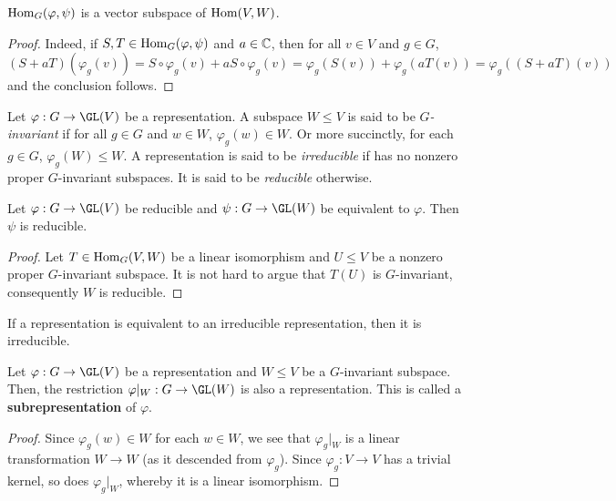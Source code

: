 \begin{proposition}
    $\operatorname{Hom}_G(\varphi,\psi)$ is a vector subspace of $\operatorname{Hom}(V,W)$.
\end{proposition}
\begin{proof}
    Indeed, if $S,T\in\operatorname{Hom}_G(\varphi,\psi)$ and $a\in\mathbb{C}$, then for all $v\in V$ and $g\in G$, 
    \begin{equation*}
        (S + aT)(\varphi_g(v)) = S\circ\varphi_g(v) + aS\circ\varphi_g(v) = \varphi_g(S(v)) + \varphi_g(aT(v)) = \varphi_g((S + aT)(v))
    \end{equation*}
    and the conclusion follows.
\end{proof}

\begin{definition}
    Let $\varphi: G\to\GL(V)$ be a representation. A subspace $W\le V$ is said to be \textit{$G$-invariant} if for all $g\in G$ and $w\in W$, $\varphi_g(w)\in W$. Or more succinctly, for each $g\in G$, $\varphi_g(W)\le W$. A representation is said to be \textit{irreducible} if has no nonzero proper $G$-invariant subspaces. It is said to be \textit{reducible} otherwise.
\end{definition}

\begin{proposition}
    Let $\varphi: G\to\GL(V)$ be reducible and $\psi: G\to\GL(W)$ be equivalent to $\varphi$. Then $\psi$ is reducible.
\end{proposition}
\begin{proof}
    Let $T\in\operatorname{Hom}_G(V,W)$ be a linear isomorphism and $U\le V$ be a nonzero proper $G$-invariant subspace. It is not hard to argue that $T(U)$ is $G$-invariant, consequently $W$ is reducible.
\end{proof}

\begin{corollary}
    If a representation is equivalent to an irreducible representation, then it is irreducible.
\end{corollary}

\begin{lemma}
    Let $\varphi: G\to\GL(V)$ be a representation and $W\le V$ be a $G$-invariant subspace. Then, the restriction $\varphi|_W: G\to\GL(W)$ is also a representation. This is called a \textbf{subrepresentation} of $\varphi$.
\end{lemma}
\begin{proof}
    Since $\varphi_g(w)\in W$ for each $w\in W$, we see that $\varphi_g|_W$ is a linear transformation $W\to W$ (as it descended from $\varphi_g$). Since $\varphi_g: V\to V$ has a trivial kernel, so does $\varphi_g|_W$, whereby it is a linear isomorphism.
\end{proof}

